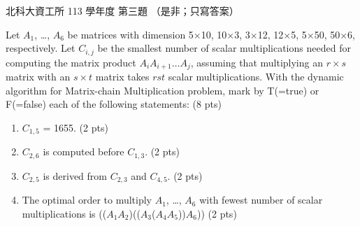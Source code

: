 \begin{pastexam}[label={px:ntut-113-ci-03}]{北科大資工所 113 學年度 第三題}
（是非；只寫答案）

Let $A_1$, \ldots, $A_6$ be matrices with dimension 5$\times$10, 10$\times$3, 3$\times$12, 12$\times$5,
5$\times$50, 50$\times$6, respectively. Let $C_{i,j}$ be the smallest number of scalar multiplications needed
for computing the matrix product $A_iA_{i+1}\ldots A_j$, assuming that multiplying an $r\times s$ matrix with
an $s\times t$ matrix takes $rst$ scalar multiplications. With the dynamic algorithm for Matrix-chain
Multiplication problem, mark by T(=true) or F(=false) each of the following statements: (8 pts)
\begin{enumerate}[label=(\arabic*)]
\item $C_{1,5}$ = 1655. (2 pts)
\item $C_{2,6}$ is computed before $C_{1,3}$. (2 pts)
\item $C_{2,5}$ is derived from $C_{2,3}$ and $C_{4,5}$. (2 pts)
\item The optimal order to multiply $A_1$, \ldots, $A_6$ with fewest number of scalar multiplications is
(($A_1A_2$)(($A_3$($A_4A_5$))$A_6$)) (2 pts)
\end{enumerate}
\end{pastexam}

